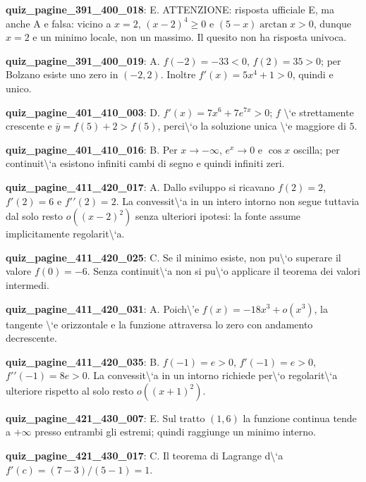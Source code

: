 \documentclass[11pt,a4paper]{article}
\newcounter{quiz}
\begin{document}
\noindent\textbf{quiz\_pagine\_391\_400\_018}: E. ATTENZIONE: risposta ufficiale E, ma anche A e falsa: vicino a $x=2$, $(x-2)^4\geq0$ e $(5-x)\arctan x>0$, dunque $x=2$ e un minimo locale, non un massimo. Il quesito non ha risposta univoca.\par\medskip
\noindent\textbf{quiz\_pagine\_391\_400\_019}: A. $f(-2)=-33<0$, $f(2)=35>0$; per Bolzano esiste uno zero in $(-2,2)$. Inoltre $f\prime(x)=5x^4+1>0$, quindi e unico.\par\medskip
\noindent\textbf{quiz\_pagine\_401\_410\_003}: D. $f\prime(x)=7x^6+7e^{7x}>0$; $f$ \textbackslash{}`e strettamente crescente e $\bar y=f(5)+2>f(5)$, perci\textbackslash{}`o la soluzione unica \textbackslash{}`e maggiore di $5$.\par\medskip
\noindent\textbf{quiz\_pagine\_401\_410\_016}: B. Per $x\to-\infty$, $e^x\to0$ e $\cos x$ oscilla; per continuit\textbackslash{}`a esistono infiniti cambi di segno e quindi infiniti zeri.\par\medskip
\noindent\textbf{quiz\_pagine\_411\_420\_017}: A. Dallo sviluppo si ricavano $f(2)=2$, $f\prime(2)=6$ e $f\prime\prime(2)=2$. La convessit\textbackslash{}`a in un intero intorno non segue tuttavia dal solo resto $o((x-2)^2)$ senza ulteriori ipotesi: la fonte assume implicitamente regolarit\textbackslash{}`a.\par\medskip
\noindent\textbf{quiz\_pagine\_411\_420\_025}: C. Se il minimo esiste, non pu\textbackslash{}`o superare il valore $f(0)=-6$. Senza continuit\textbackslash{}`a non si pu\textbackslash{}`o applicare il teorema dei valori intermedi.\par\medskip
\noindent\textbf{quiz\_pagine\_411\_420\_031}: A. Poich\textbackslash{}'e $f(x)=-18x^3+o(x^3)$, la tangente \textbackslash{}`e orizzontale e la funzione attraversa lo zero con andamento decrescente.\par\medskip
\noindent\textbf{quiz\_pagine\_411\_420\_035}: B. $f(-1)=e>0$, $f\prime(-1)=e>0$, $f\prime\prime(-1)=8e>0$. La convessit\textbackslash{}`a in un intorno richiede per\textbackslash{}`o regolarit\textbackslash{}`a ulteriore rispetto al solo resto $o((x+1)^2)$.\par\medskip
\noindent\textbf{quiz\_pagine\_421\_430\_007}: E. Sul tratto $(1,6)$ la funzione continua tende a $+\infty$ presso entrambi gli estremi; quindi raggiunge un minimo interno.\par\medskip
\noindent\textbf{quiz\_pagine\_421\_430\_017}: C. Il teorema di Lagrange d\textbackslash{}`a $f\prime(c)=(7-3)/(5-1)=1$.\par\medskip
\end{document}
